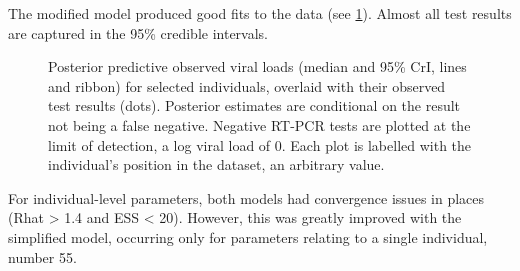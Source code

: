 \documentclass[thesis.tex]{subfiles}
\begin{document}
The modified model produced good fits to the data (see \cref{ATACCC:fig:goodness-of-fits}).
Almost all test results are captured in the 95\% credible intervals.
\begin{figure}
  \caption[Posterior predictive viral load fits]{Posterior predictive observed viral loads (median and 95\% CrI, lines and ribbon) for selected individuals, overlaid with their observed test results (dots). Posterior estimates are conditional on the result not being a false negative. Negative RT-PCR tests are plotted at the limit of detection, \ie a log viral load of 0. Each plot is labelled with the individual's position in the dataset, an arbitrary value. \label{ATACCC:fig:goodness-of-fits}}
\end{figure}

For individual-level parameters, both models had convergence issues in places (Rhat > 1.4 and ESS < 20).
However, this was greatly improved with the simplified model, occurring only for parameters relating to a single individual, number 55.
\end{document}
